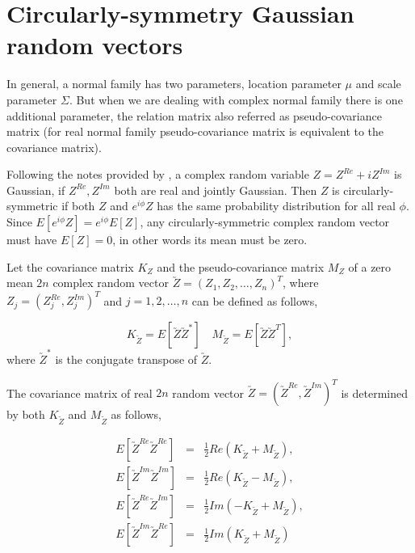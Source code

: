
\section{Circularly-symmetry Gaussian random vectors}

In general, a normal family has two parameters, location parameter $\mu$ and scale parameter $\Sigma$. But when we are dealing with complex normal family there is one additional parameter, the relation matrix also referred as pseudo-covariance matrix (for real normal family pseudo-covariance matrix is equivalent to the covariance matrix).

Following the notes provided by \cite{Gallager2008}, a complex random variable $Z = Z^{Re} + iZ^{Im}$ is Gaussian, if $Z^{Re}, Z^{Im}$ both are real and jointly Gaussian. Then $Z$ is circularly-symmetric if both $ Z$ and $e^{i\phi} Z$ has the same probability distribution for all real $\phi$.  Since $E[e^{i\phi}Z] = e^{i\phi}E[Z]$, any circularly-symmetric complex random vector must have $E[Z]=0$, in other words its mean must be zero.

Let the covariance matrix $K_Z$ and the pseudo-covariance matrix $M_Z$ of a zero mean $2n$ complex random vector $\utilde{Z} = (Z_1, Z_2, \ldots, Z_n)^T$, where $Z_j = (Z_j^{Re}, Z_j^{Im})^T$ and $j=1,2,\ldots, n$ can be defined as follows,

\[ K_{\utilde{Z}} = E[\utilde{Z}\utilde{Z}^*]\quad M_{\utilde{Z}} = E[\utilde{Z}\utilde{Z}^T],\]
where $\utilde{Z}^*$ is the conjugate transpose of $\utilde{Z}$.

The covariance matrix of real $2n$ random vector $\utilde{Z}=(\utilde{Z}^{Re}, \utilde{Z}^{Im})^T$ is determined by both $K_{\utilde{Z}}$ and $M_{\utilde{Z}}$ as follows,

\begin{eqnarray}
	E[\utilde{Z}^{Re}\utilde{Z}^{Re}] &=& \frac{1}{2}Re(K_{\utilde{Z}} + M_{\utilde{Z}}), \nonumber\\
	E[\utilde{Z}^{Im}\utilde{Z}^{Im}] &=& \frac{1}{2}Re(K_{\utilde{Z}} - M_{\utilde{Z}}), \nonumber\\
	E[\utilde{Z}^{Re}\utilde{Z}^{Im}] &=& \frac{1}{2}Im(-K_{\utilde{Z}} + M_{\utilde{Z}}), \nonumber\\
	E[\utilde{Z}^{Im}\utilde{Z}^{Re}] &=& \frac{1}{2}Im(K_{\utilde{Z}} + M_{\utilde{Z}}) \label{comlex_cov}
\end{eqnarray}

